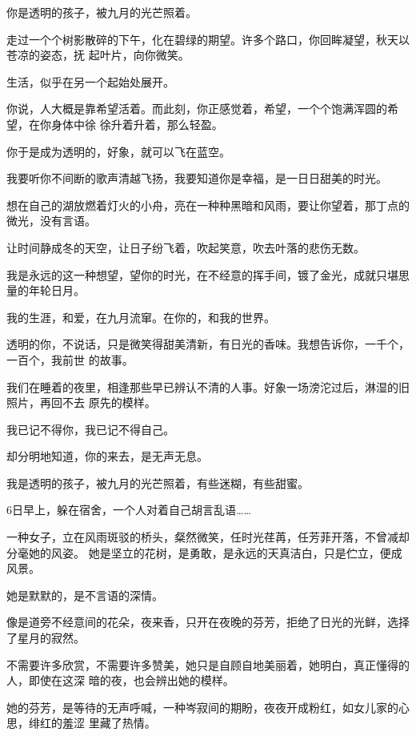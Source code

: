 	\endwriting



		你是透明的孩子，被九月的光芒照着。

		走过一个个树影散碎的下午，化在碧绿的期望。许多个路口，你回眸凝望，秋天以苍凉的姿态，抚
	起叶片，向你微笑。

		生活，似乎在另一个起始处展开。

		你说，人大概是靠希望活着。而此刻，你正感觉着，希望，一个个饱满浑圆的希望，在你身体中徐
	徐升着升着，那么轻盈。

		你于是成为透明的，好象，就可以飞在蓝空。

		我要听你不间断的歌声清越飞扬，我要知道你是幸福，是一日日甜美的时光。

		想在自己的湖放燃着灯火的小舟，亮在一种种黑暗和风雨，要让你望着，那丁点的微光，没有言语。

		让时间静成冬的天空，让日子纷飞着，吹起笑意，吹去叶落的悲伤无数。

		我是永远的这一种想望，望你的时光，在不经意的挥手间，镀了金光，成就只堪思量的年轮日月。

		我的生涯，和爱，在九月流窜。在你的，和我的世界。

		透明的你，不说话，只是微笑得甜美清新，有日光的香味。我想告诉你，一千个，一百个，我前世
	的故事。

		我们在睡着的夜里，相逢那些早已辨认不清的人事。好象一场滂沱过后，淋湿的旧照片，再回不去
	原先的模样。

		我已记不得你，我已记不得自己。\par
		却分明地知道，你的来去，是无声无息。\par
		我是透明的孩子，被九月的光芒照着，有些迷糊，有些甜蜜。\par
		6日早上，躲在宿舍，一个人对着自己胡言乱语……

	\endwriting



		一种女子，立在风雨斑驳的桥头，粲然微笑，任时光荏苒，任芳菲开落，不曾减却分毫她的风姿。
	她是坚立的花树，是勇敢，是永远的天真洁白，只是伫立，便成风景。


		她是默默的，是不言语的深情。

		像是道旁不经意间的花朵，夜来香，只开在夜晚的芬芳，拒绝了日光的光鲜，选择了星月的寂然。

		不需要许多欣赏，不需要许多赞美，她只是自顾自地美丽着，她明白，真正懂得的人，即使在这深
	暗的夜，也会辨出她的模样。

		她的芬芳，是等待的无声呼喊，一种岑寂间的期盼，夜夜开成粉红，如女儿家的心思，绯红的羞涩
	里藏了热情。

